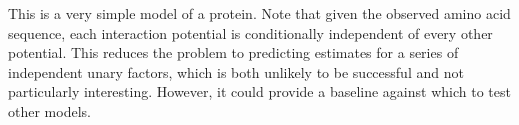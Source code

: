 \documentclass{article}
\begin{document}
%	
%		

This is a very simple model of a protein. Note that given the observed amino acid sequence, each interaction potential is conditionally independent of every other potential. This reduces the problem to predicting estimates for a series of independent unary factors, which is both unlikely to be successful and not particularly interesting. However, it could provide a baseline against which to test other models.
\end{document}
